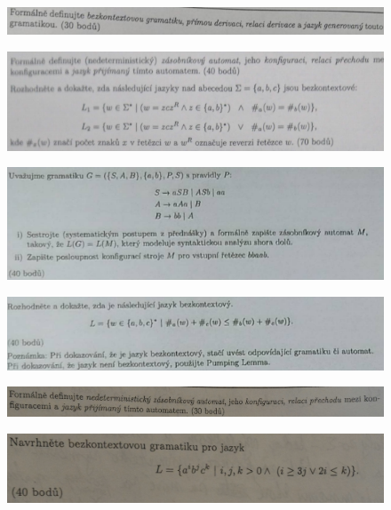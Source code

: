 \documentclass[]{article}
\begin{document}
	\begin{figure}[H]
		\includegraphics[width=\textwidth]{tasks/bezkontextove/task5.png}
	\end{figure}
	
	\begin{figure}[H]
		\includegraphics[width=\textwidth]{tasks/bezkontextove/task6.png}
	\end{figure}
	
	\begin{figure}[H]
		\includegraphics[width=\textwidth]{tasks/bezkontextove/task7.png}
	\end{figure}
	
	\begin{figure}[H]
		\includegraphics[width=\textwidth]{tasks/bezkontextove/task8.png}
	\end{figure}

	\begin{figure}[H]
		\includegraphics[width=\textwidth]{tasks/bezkontextove/task9.png}
	\end{figure}
	
	\begin{figure}[H]
		\includegraphics[width=\textwidth]{tasks/bezkontextove/task10.png}
	\end{figure}
	
\end{document}
